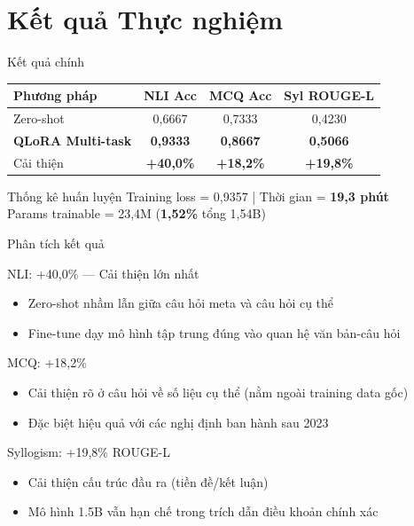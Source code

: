 \documentclass{beamer}
\begin{document}
\section{Kết quả Thực nghiệm}

\begin{frame}{Kết quả chính}
  \begin{table}
    \centering
    \begin{tabular}{lccc}
      \toprule
      \textbf{Phương pháp} & \textbf{NLI Acc} & \textbf{MCQ Acc} & \textbf{Syl ROUGE-L} \\
      \midrule
      Zero-shot & 0,6667 & 0,7333 & 0,4230 \\
      \textbf{QLoRA Multi-task} & \textbf{0,9333} & \textbf{0,8667} & \textbf{0,5066} \\
      \midrule
      Cải thiện & \textbf{+40,0\%} & \textbf{+18,2\%} & \textbf{+19,8\%} \\
      \bottomrule
    \end{tabular}
  \end{table}
  \vspace{0.4cm}
  \begin{block}{Thống kê huấn luyện}
    Training loss = 0,9357 \quad | \quad Thời gian = \textbf{19,3 phút} \\
    Params trainable = 23,4M (\textbf{1,52\%} tổng 1,54B)
  \end{block}
\end{frame}

\begin{frame}{Phân tích kết quả}
  \begin{block}{NLI: +40,0\% --- Cải thiện lớn nhất}
    \begin{itemize}
      \item Zero-shot nhầm lẫn giữa câu hỏi meta và câu hỏi cụ thể
      \item Fine-tune dạy mô hình tập trung đúng vào quan hệ văn bản-câu hỏi
    \end{itemize}
  \end{block}
  \begin{block}{MCQ: +18,2\%}
    \begin{itemize}
      \item Cải thiện rõ ở câu hỏi về số liệu cụ thể (nằm ngoài training data gốc)
      \item Đặc biệt hiệu quả với các nghị định ban hành sau 2023
    \end{itemize}
  \end{block}
  \begin{block}{Syllogism: +19,8\% ROUGE-L}
    \begin{itemize}
      \item Cải thiện cấu trúc đầu ra (tiền đề/kết luận)
      \item Mô hình 1.5B vẫn hạn chế trong trích dẫn điều khoản chính xác
    \end{itemize}
  \end{block}
\end{frame}
\end{document}
